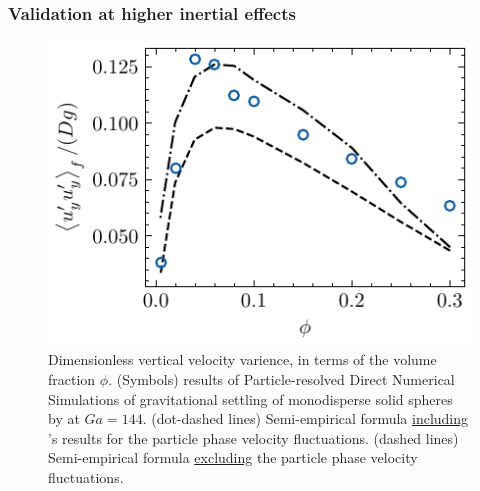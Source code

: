 \documentclass{sintefbeamer}
\begin{document}
\begin{frame}
  \frametitle{Validation at higher inertial effects }

  \begin{figure}
    \centering
    \includegraphics[height = 0.25\textwidth]{image/HOMOGENEOUS_final/CA/tariq.pdf}
    \caption{Dimensionless vertical velocity varience, in terms of the volume fraction $\phi$. 
    (Symbols) results of Particle-resolved Direct Numerical Simulations  of gravitational settling of monodisperse solid spheres by \citet{shajahan2023inertial} at $Ga = 144$. 
    (dot-dashed lines) Semi-empirical formula \underline{including} \citet{shajahan2023inertial}'s results for the particle phase velocity fluctuations. 
    (dashed lines) Semi-empirical formula \underline{excluding} the particle phase velocity fluctuations. 
    }
    \label{fig:tariq}
\end{figure}

\end{frame}
\end{document}
